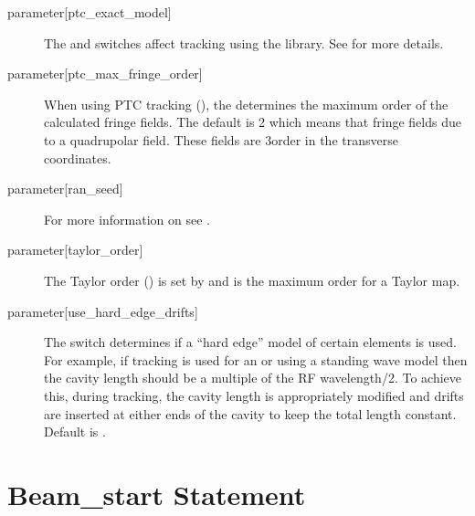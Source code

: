 \begin{description}
  \item[{parameter[ptc_exact_model]}] \Newline
The  and  switches affect
tracking using the  library. See  for more
details.

  \item[{parameter[ptc_max_fringe_order]}] \Newline
When using PTC tracking (), the
 determines the maximum order of
the calculated fringe fields. The default is 2 which means that fringe
fields due to a quadrupolar field. These fields are 3\Rd order in the
transverse coordinates.

  \item[{parameter[ran_seed]}] \Newline
For more information on  see .

  \item[{parameter[taylor_order]}] \Newline
The Taylor order () is set by
 and is the maximum order for a Taylor map.

  \item[{parameter[use_hard_edge_drifts]}] \Newline
The  switch determines if a ``hard edge''
model of certain elements is used. For example, if 
tracking is used for an  or  using a standing
wave model then the cavity length should be a multiple of the RF
wavelength/2. To achieve this, during tracking, the cavity length is
appropriately modified and drifts are inserted at either ends of the
cavity to keep the total length constant. Default is .

  \end{description}

\section{Beam_start Statement} \label{s:beam.start}

